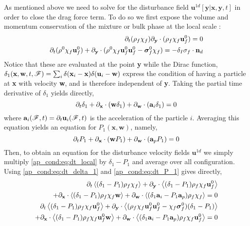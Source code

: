 As mentioned above we need to solve for the disturbance field $\textbf{u}^{1d}[\textbf{y}|\textbf{x},\textbf{y},t]$ in order to close the drag force term. 
To do so we first expose the volume and momentum conservation of the mixture or bulk phase at the local scale :
\begin{align}
    \partial_t (\rho_f\chi_f) {\partial_\textbf{y}} \cdot (\rho_f\chi_f\textbf{u}^0_f) = 0 \\
    \partial_t (\rho^0\chi_f\textbf{u}^0_f)
    + {\partial_\textbf{y}}\cdot (\rho^0\chi_f\textbf{u}^0_f\textbf{u}^0_f - \bm\sigma^0_f\chi_f)
    = - \delta_I \sigma_f \cdot \textbf{n}_d  
    \label{ap_cond:eq:dt_local}
\end{align}
Notice that these are evaluated at the point \textbf{y} while the Dirac function, $\delta_1(\textbf{x},\textbf{w},t,\mathscr{F}) = \sum_i \delta(\textbf{x}_i-\textbf{x})\delta(\textbf{u}_i - \textbf{w})$ express the condition of having a particle at \textbf{x} with velocity \textbf{w}, and is therefore independent of \textbf{y}. 
Taking the partial time derivative of $\delta_1$ yields directly, 
\begin{equation}
    \partial_t\delta_1 
    + {\partial_\textbf{x}}\cdot(\textbf{w}\delta_1)
    + {\partial_\textbf{w}}\cdot(\textbf{a}_i\delta_1)
    = 0 
    \label{ap_cond:eq:dt_delta_1}
\end{equation}
where $\textbf{a}_i(\mathscr{F},t) = \partial_t \textbf{u}_i(\mathscr{F},t)$ is the acceleration of the particle $i$. 
Averaging this equation yields an equation for  $P_1(\textbf{x},\textbf{w})$, namely, 
\begin{equation}
    \partial_t P_1 
    + {\partial_\textbf{x}}\cdot(\textbf{w} P_1)
    + {\partial_\textbf{w}}\cdot(\textbf{a}_p P_1)
    = 0 
    \label{ap_cond:eq:dt_P_1}
\end{equation}
Then, to obtain an equation for the disturbance velocity fields $\textbf{u}^{1d}$ we simply multiply \ref{ap_cond:eq:dt_local} by $\delta_1 - P_1$ and average over all configuration. 
Using \ref{ap_cond:eq:dt_delta_1} and \ref{ap_cond:eq:dt_P_1} gives directly, 
\begin{align}
    \partial_t \left<(\delta_1 - P_1)\rho_f\chi_f\right>
    + {\partial_\textbf{y}}\cdot \left<(\delta_1 - P_1)\rho_f\chi_f\textbf{u}^0_f\right> \nonumber \\
    + {\partial_\textbf{x}}\cdot \left<(\delta_1 - P_1)\rho_f \chi_f \textbf{w}\right>
    + {\partial_\textbf{w}}\cdot \left<(\delta_1\textbf{a}_i - P_1\textbf{a}_p)\rho_f \chi_f \right>
    = 0 
    \\
    \partial_t \left<(\delta_1 - P_1)\rho_f \chi_f \textbf{u}^0_f\right>
    + {\partial_\textbf{y}}\cdot \left<(\rho_f \chi_f \textbf{u}^0_f\textbf{u}^0_f- \chi_f \bm\sigma^0_f )(\delta_1 - P_1)\right> \nonumber \\ 
    + {\partial_\textbf{x}}\cdot \left<(\delta_1 - P_1)\rho_f \chi_f \textbf{u}^0_f\textbf{w}\right>
    + {\partial_\textbf{w}}\cdot \left<(\delta_1\textbf{a}_i - P_1\textbf{a}_p)\rho_f \chi_f \textbf{u}^0_f\right>
    = 0 
    \label{ap_cond:eq:conditional_eqs}
\end{align}
